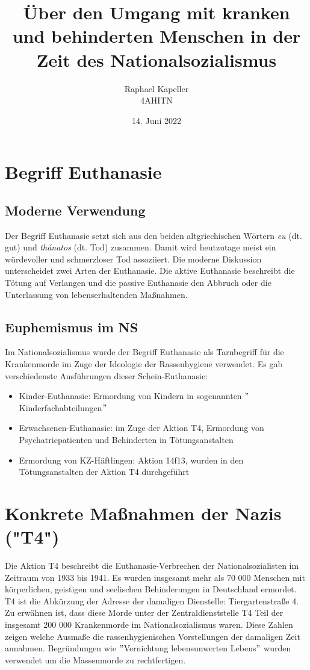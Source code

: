 \documentclass[a4paper, ngerman]{article}
\title{Über den Umgang mit kranken und behinderten Menschen in der Zeit des Nationalsozialismus}
\date{14. Juni 2022}
\author{Raphael Kapeller\\ 4AHITN}
\begin{document}
\maketitle

\section*{Begriff Euthanasie}
\subsection*{Moderne Verwendung}

Der Begriff Euthanasie setzt sich aus den beiden altgriechischen Wörtern \textit{eu} (dt. gut) und \textit{thánatos} (dt. Tod)
zusammen. Damit wird heutzutage meist ein würdevoller und schmerzloser Tod assoziiert. Die moderne
Diskussion unterscheidet zwei Arten der Euthanasie. Die aktive Euthanasie beschreibt die Tötung auf
Verlangen und die passive Euthanasie den Abbruch oder die Unterlassung von lebenserhaltenden Maßnahmen.

\subsection*{Euphemismus im NS}

Im Nationalsozialismus wurde der Begriff Euthanasie als Tarnbegriff für die Krankenmorde im Zuge
der Ideologie der Rassenhygiene verwendet. Es gab verschiedenste Ausführungen dieser Schein-Euthanasie:
\begin{itemize}
    \item Kinder-Euthanasie: Ermordung von Kindern in sogenannten $"$Kinderfachabteilungen$"$
    \item Erwachsenen-Euthanasie: im Zuge der Aktion T4, Ermordung von Psychatriepatienten und Behinderten in Tötungsanstalten
    \item Ermordung von KZ-Häftlingen: Aktion 14f13, wurden in den Tötungsanstalten der Aktion T4 durchgeführt
\end{itemize}

\section*{Konkrete Maßnahmen der Nazis ("T4")}

Die Aktion T4 beschreibt die Euthanasie-Verbrechen der Nationalsozialisten im Zeitraum von 1933 bis 1941.
Es wurden insgesamt mehr als 70 000 Menschen mit körperlichen, geistigen und seelischen Behinderungen in
Deutschland ermordet. T4 ist die Abkürzung der Adresse der damaligen Dienstelle: Tiergartenstraße 4.
Zu erwähnen ist, dass diese Morde unter der Zentraldienststelle T4 Teil der insgesamt
200 000 Krankenmorde im Nationalsozialismus waren. Diese Zahlen zeigen welche Ausmaße die rassenhygienischen
Vorstellungen der damaligen Zeit annahmen. Begründungen wie $"$Vernichtung lebensunwerten Lebens$"$
wurden verwendet um die Massenmorde zu rechtfertigen.
\end{document}
